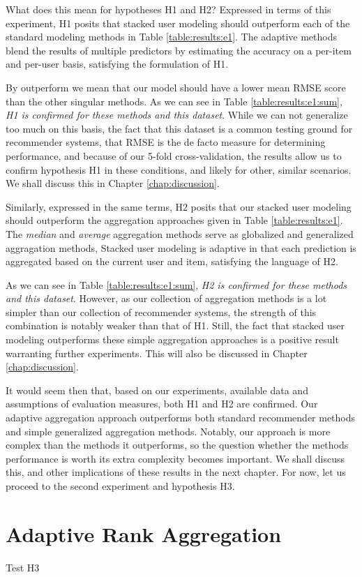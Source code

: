What does this mean for hypotheses H1 and H2?
Expressed in terms of this experiment,
H1 posits that stacked user modeling should outperform each of the standard modeling methods
in Table \ref{table:results:e1}.
The adaptive methods blend the results of multiple predictors by estimating the accuracy
on a per-item and per-user basis, satisfying the formulation of H1.

By outperform we mean that our model should have a lower
mean RMSE score than the other singular methods. As we can see in Table \ref{table:results:e1:sum},
\emph{H1 is confirmed for these methods and this dataset}.
While we can not generalize too much on this basis, 
the fact that this dataset is a common testing ground for recommender systems,
that RMSE is the de facto measure for determining performance,
and because of our 5-fold cross-validation, the results allow us 
to confirm hypothesis H1 in these conditions, and likely for other, similar scenarios.
We shall discuss this in Chapter \ref{chap:discussion}.

Similarly, expressed in the same terms, H2 posits that 
our stacked user modeling should outperform the aggregation approaches
given in Table \ref{table:results:e1}.
The \emph{median} and \emph{average} aggregation methods
serve as globalized and generalized aggragation methods,
Stacked user modeling is adaptive in that each prediction is 
aggregated based on the current user and item,
satisfying the language of H2.

As we can see in Table \ref{table:results:e1:sum},
\emph{H2 is confirmed for these methods and this dataset}.
However, as our collection of aggregation methods is a lot simpler
than our collection of recommender systems, the strength of this combination
is notably weaker than that of H1.
Still, the fact that stacked user modeling outperforms these simple aggregation
approaches is a positive result warranting further experiments.
This will also be discussed in Chapter \ref{chap:discussion}.

It would seem then that, based on our experiments, available data
and assumptions of evaluation measures, both H1 and H2 are confirmed.
Our adaptive aggregation approach outperforms both standard recommender
methods and simple generalized aggregation methods.
Notably, our approach is more complex than the methods it outperforms,
so the question whether the methods performance is worth its extra complexity becomes important.
We shall discuss this, and other implications of these results in the next chapter.
For now, let us proceed to the second experiment and hypothesis H3.


\section{Adaptive Rank Aggregation}

Test H3




